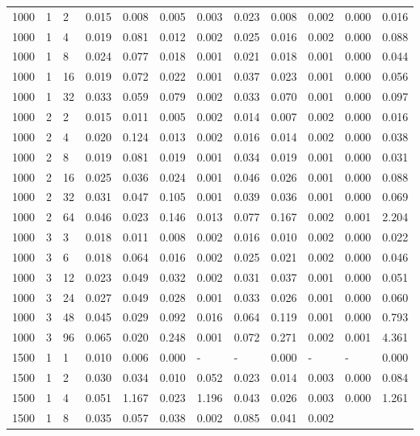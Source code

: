 \begin{longtable}[]{@{}llllllllllll@{}}
1000 & 1 & 2 & 0.015 & 0.008 & 0.005 & 0.003 & 0.023 & 0.008 & 0.002 &
0.000 & 0.016 \\
1000 & 1 & 4 & 0.019 & 0.081 & 0.012 & 0.002 & 0.025 & 0.016 & 0.002 &
0.000 & 0.088 \\
1000 & 1 & 8 & 0.024 & 0.077 & 0.018 & 0.001 & 0.021 & 0.018 & 0.001 &
0.000 & 0.044 \\
1000 & 1 & 16 & 0.019 & 0.072 & 0.022 & 0.001 & 0.037 & 0.023 & 0.001 &
0.000 & 0.056 \\
1000 & 1 & 32 & 0.033 & 0.059 & 0.079 & 0.002 & 0.033 & 0.070 & 0.001 &
0.000 & 0.097 \\
1000 & 2 & 2 & 0.015 & 0.011 & 0.005 & 0.002 & 0.014 & 0.007 & 0.002 &
0.000 & 0.016 \\
1000 & 2 & 4 & 0.020 & 0.124 & 0.013 & 0.002 & 0.016 & 0.014 & 0.002 &
0.000 & 0.038 \\
1000 & 2 & 8 & 0.019 & 0.081 & 0.019 & 0.001 & 0.034 & 0.019 & 0.001 &
0.000 & 0.031 \\
1000 & 2 & 16 & 0.025 & 0.036 & 0.024 & 0.001 & 0.046 & 0.026 & 0.001 &
0.000 & 0.088 \\
1000 & 2 & 32 & 0.031 & 0.047 & 0.105 & 0.001 & 0.039 & 0.036 & 0.001 &
0.000 & 0.069 \\
1000 & 2 & 64 & 0.046 & 0.023 & 0.146 & 0.013 & 0.077 & 0.167 & 0.002 &
0.001 & 2.204 \\
1000 & 3 & 3 & 0.018 & 0.011 & 0.008 & 0.002 & 0.016 & 0.010 & 0.002 &
0.000 & 0.022 \\
1000 & 3 & 6 & 0.018 & 0.064 & 0.016 & 0.002 & 0.025 & 0.021 & 0.002 &
0.000 & 0.046 \\
1000 & 3 & 12 & 0.023 & 0.049 & 0.032 & 0.002 & 0.031 & 0.037 & 0.001 &
0.000 & 0.051 \\
1000 & 3 & 24 & 0.027 & 0.049 & 0.028 & 0.001 & 0.033 & 0.026 & 0.001 &
0.000 & 0.060 \\
1000 & 3 & 48 & 0.045 & 0.029 & 0.092 & 0.016 & 0.064 & 0.119 & 0.001 &
0.000 & 0.793 \\
1000 & 3 & 96 & 0.065 & 0.020 & 0.248 & 0.001 & 0.072 & 0.271 & 0.002 &
0.001 & 4.361 \\
1500 & 1 & 1 & 0.010 & 0.006 & 0.000 & - & - & 0.000 & - & - & 0.000 \\
1500 & 1 & 2 & 0.030 & 0.034 & 0.010 & 0.052 & 0.023 & 0.014 & 0.003 &
0.000 & 0.084 \\
1500 & 1 & 4 & 0.051 & 1.167 & 0.023 & 1.196 & 0.043 & 0.026 & 0.003 &
0.000 & 1.261 \\
1500 & 1 & 8 & 0.035 & 0.057 & 0.038 & 0.002 & 0.085 & 0.041 & 0.002 &

\end{longtable}

